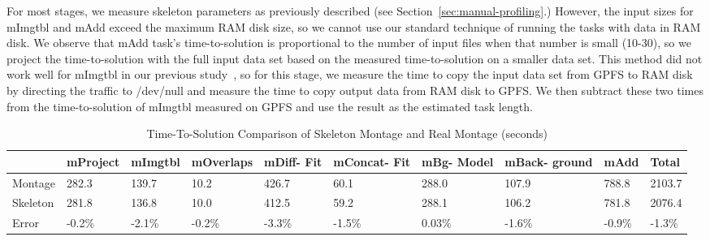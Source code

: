 \documentclass[preprint,12pt]{elsarticle}
\newcommand{\zhaonote}[1]{{\textcolor{darkgreen}{ ***Zhao:  #1 }}}
\newcommand{\zhaonote}[1]{}
\begin{document}
For most stages,  
we measure skeleton parameters as previously described (see Section~\ref{sec:manual-profiling}.)  However,
the input sizes for mImgtbl and mAdd exceed the maximum RAM disk size,
so we cannot use our standard technique of running the tasks with data in RAM disk. 
We observe that mAdd task's time-to-solution is proportional 
to the number of input files when that number is small (10-30), so we project the time-to-solution 
with the full input data set based on the measured time-to-solution on a smaller data set.
This method did not work well for mImgtbl in our previous study~\cite{Skeleton2013}, so for this stage, we measure the time to copy the input data set from GPFS to RAM disk by directing
the traffic to /dev/null and measure the time to copy output data from RAM disk to GPFS. 
We then subtract these two times from the time-to-solution of mImgtbl measured on GPFS and use
the result as the estimated task length. 

\begin{table}[]
\begin{center}
    \caption{Time-To-Solution Comparison of Skeleton Montage and Real Montage (seconds)}
    \begin{scriptsize}
    \begin{tabular}{ | p{1cm} | p{1.05cm} | p{1cm} | p{1.2cm} | p{0.75cm} | p{1.1cm} | p{0.8cm} | p{1.0cm} | p{0.75cm} | p{0.8cm} |}
    \hline
	& mProject & mImgtbl & mOverlaps & mDiff- Fit & mConcat- Fit & mBg- Model & mBack- ground & mAdd & Total\\ \hline \hline
	Montage & 282.3 & 139.7 & 10.2 & 426.7 & 60.1 & 288.0 & 107.9 &  788.8 & 2103.7\\ \hline
	Skeleton & 281.8 & 136.8 & 10.0 & 412.5 & 59.2 & 288.1 & 106.2 &  781.8 & 2076.4\\ \hline
	Error & -0.2\% & -2.1\% & -0.2\% & -3.3\% & -1.5\% & 0.03\% & -1.6\% & -0.9\% & -1.3\%\\ \hline
    \end{tabular}
    \end{scriptsize}
    \label{tb:montage-results}
\end{center}   
\end{table}
\end{document}
